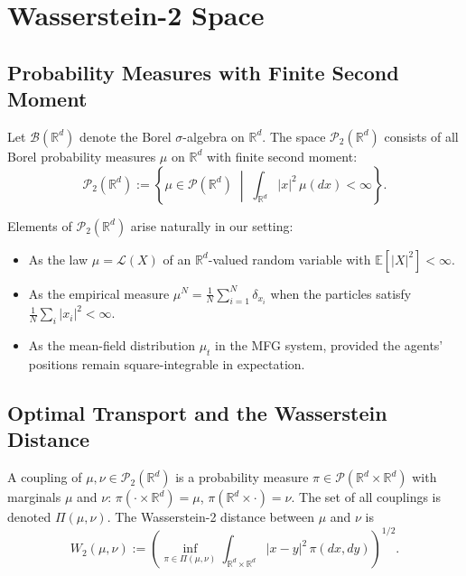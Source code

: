 \section{Wasserstein-2 Space}
\label{sec:mp-wasserstein}

\subsection{Probability Measures with Finite Second Moment}

Let $\mathcal{B}(\mathbb{R}^d)$ denote the Borel $\sigma$-algebra on $\mathbb{R}^d$. The
space $\mathcal{P}_2(\mathbb{R}^d)$ consists of all Borel probability measures $\mu$ on
$\mathbb{R}^d$ with finite second moment:
\begin{equation}
    \mathcal{P}_2(\mathbb{R}^d) := \left\{ \mu \in \mathcal{P}(\mathbb{R}^d) \;\middle|\;
    \int_{\mathbb{R}^d} |x|^2\, \mu(dx) < \infty \right\}.
    \label{eq:p2-def}
\end{equation}

Elements of $\mathcal{P}_2(\mathbb{R}^d)$ arise naturally in our setting:
\begin{itemize}
    \item As the law $\mu = \mathcal{L}(X)$ of an $\mathbb{R}^d$-valued random variable
    with $\mathbb{E}[|X|^2] < \infty$.
    \item As the empirical measure $\mu^N = \frac{1}{N}\sum_{i=1}^N \delta_{x_i}$ when
    the particles satisfy $\frac{1}{N}\sum_i |x_i|^2 < \infty$.
    \item As the mean-field distribution $\mu_t$ in the MFG system, provided the
    agents' positions remain square-integrable in expectation.
\end{itemize}

\subsection{Optimal Transport and the Wasserstein Distance}

\begin{definition}
A coupling of $\mu, \nu \in \mathcal{P}_2(\mathbb{R}^d)$ is a probability measure
$\pi \in \mathcal{P}(\mathbb{R}^d \times \mathbb{R}^d)$ with marginals $\mu$ and $\nu$:
$\pi(\cdot \times \mathbb{R}^d) = \mu$, $\pi(\mathbb{R}^d \times \cdot) = \nu$. The set of
all couplings is denoted $\Pi(\mu, \nu)$. The Wasserstein-2 distance between $\mu$ and
$\nu$ is
\begin{equation}
    W_2(\mu, \nu) := \left( \inf_{\pi \in \Pi(\mu,\nu)} \int_{\mathbb{R}^d \times
    \mathbb{R}^d} |x-y|^2\, \pi(dx,dy) \right)^{1/2}.
    \label{eq:wasserstein-def}
\end{equation}
\end{definition}

